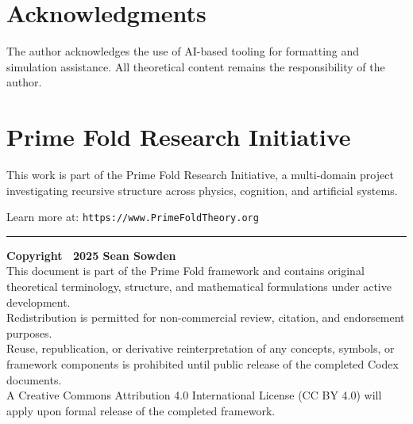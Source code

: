 \documentclass[12pt]{article}
\begin{document}
\section*{Acknowledgments}
The author acknowledges the use of AI-based tooling for formatting and simulation assistance. All theoretical content remains the responsibility of the author.

\section*{Prime Fold Research Initiative}
This work is part of the Prime Fold Research Initiative, a multi-domain project investigating recursive structure across physics, cognition, and artificial systems.

Learn more at: \texttt{https://www.PrimeFoldTheory.org}



\vspace{1.5cm}
\hrule
\vspace{0.5em}
\noindent
\textbf{Copyright \textcopyright\ 2025 Sean Sowden} \\
This document is part of the Prime Fold framework and contains original theoretical terminology, structure, and mathematical formulations under active development. \\
Redistribution is permitted for non-commercial review, citation, and endorsement purposes. \\
Reuse, republication, or derivative reinterpretation of any concepts, symbols, or framework components is prohibited until public release of the completed Codex documents. \\
A Creative Commons Attribution 4.0 International License (CC BY 4.0) will apply upon formal release of the completed framework.
\end{document}
